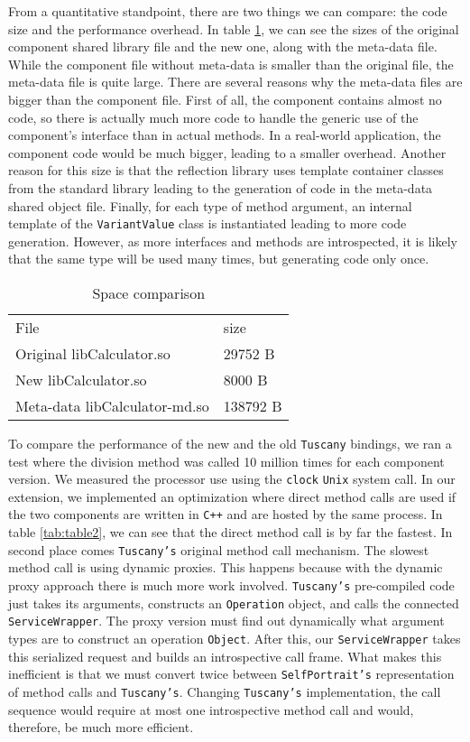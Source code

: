 From a quantitative standpoint, there are two things we can compare: the code size and the performance overhead.
In table \ref{tab:table1}, we can see the sizes of the original component shared library file and the new one,
along with the meta-data file. While the component file without meta-data is smaller than the original file,
the meta-data file is quite large. There are several reasons why the meta-data files are bigger than the component
file. First of all, the component contains almost no code, so there is actually much more code to handle the
generic use of the component's interface than in actual methods. In a real-world application, the component code
would be much bigger, leading to a smaller overhead. Another reason for this size is that the reflection library
uses template container classes from the standard library leading to the generation of code in the meta-data shared
object file. Finally, for each type of method argument, an internal template of the \texttt{VariantValue} class
is instantiated leading to more code generation. However, as more interfaces and methods are introspected, it is
likely that the same type will be used many times, but generating code only once.

\begin{table}[ht]
\centering
\caption{Space comparison}
\label{tab:table1}
\begin{tabular}{ll}
\hline\noalign{\smallskip}
File & size\\
\noalign{\smallskip}
\hline
\noalign{\smallskip}
Original libCalculator.so & 29752 B\\
New libCalculator.so & 8000 B\\
Meta-data libCalculator-md.so & 138792 B\\
\hline
\end{tabular}
\end{table}

To compare the performance of the new and the old \texttt{Tuscany} bindings, we ran a test where the
division method was called 10 million times for each component version. We measured the processor use
using the \texttt{clock} \texttt{Unix} system call. In our extension, we implemented an optimization where
direct method calls are used if the two components are written in \texttt{C++} and are hosted by the same
process. In table \ref{tab:table2}, we can see that the direct method call is by far the fastest. In second
place comes \texttt{Tuscany's} original method call mechanism. The slowest method call is using dynamic proxies.
This happens because with the dynamic proxy approach there is much more work involved. \texttt{Tuscany's}
pre-compiled code just takes its arguments, constructs an \texttt{Operation} object, and calls the connected
\texttt{ServiceWrapper}. The proxy version must find out dynamically what argument types are to construct
an operation \texttt{Object}. After this, our \texttt{ServiceWrapper} takes this serialized request and
builds an introspective call frame. What makes this inefficient is that we must convert twice between \texttt{SelfPortrait's}
representation of method calls and \texttt{Tuscany's}. Changing \texttt{Tuscany's} implementation, the call sequence would
require at most one introspective method call and would, therefore, be much more efficient.

